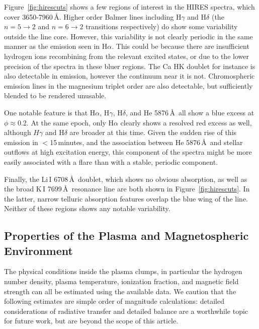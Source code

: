 \documentclass{nature3}
\begin{document}
\begin{methods}
Figure~\ref{fig:hirescuts} shows a few regions of interest in the
HIRES spectra, which cover 3650-7960\,\AA.  Higher order Balmer lines
including H$\gamma$ and H$\delta$ (the $n=5\rightarrow2$ and
$n=6\rightarrow2$ transitions respectively) do show some variability
outside the line core.  However, this variability is not clearly
periodic in the same manner as the emission seen in H$\alpha$.  This
could be because there are insufficient hydrogen ions recombining from
the relevant excited states, or due to the lower precision of the
spectra in these bluer regions.  The Ca HK doublet for instance is
also detectable in emission, however the continuum near it is not.
Chromospheric emission lines in the magnesium triplet order are also
detectable, but sufficiently blended to be rendered unusable.

One notable feature is that H$\alpha$, H$\gamma$, H$\delta$, and He
5876\,\AA\ all show a blue excess at $\phi$$\approx$0.2.  At the same
epoch, only H$\alpha$ clearly shows a resolved red excess as well,
although $H\gamma$ and H$\delta$ are broader at this time.  Given the
sudden rise of this emission in $<$15\,minutes, and the association
between He 5876\,\AA\ and stellar outflows at high excitation energy,
this component of the spectra might be more easily associated with a
flare than with a stable, periodic component.

Finally, the Li\,\textsc{I} 6708\,\AA\ doublet, which shows no obvious
absorption, as well as the broad K\,\textsc{I} 7699\,\AA\ resonance
line are both shown in Figure~\ref{fig:hirescuts}.  In the latter,
narrow telluric absorption features overlap the blue wing of the line.
Neither of these regions shows any notable variability.


\subsection{Properties of the Plasma and Magnetospheric Environment}\phantom{+}
\label{subsec:gas}

The physical conditions inside the plasma clumps, in particular the
hydrogen number density, plasma temperature, ionization fraction, and
magnetic field strength can all be estimated using the available data.
We caution that the following estimates are simple order of magnitude
calculations: detailed
considerations of radiative transfer and detailed balance are a
worthwhile topic for future work, but are beyond the scope of this
article.


\end{methods}
\end{document}
